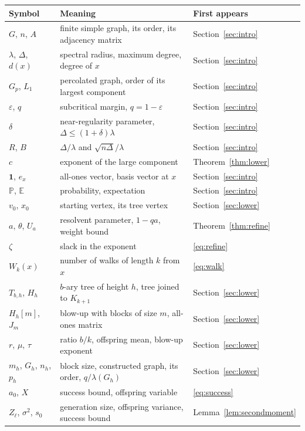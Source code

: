 \documentclass[11pt]{amsart}
\theoremstyle{remark}
\newcommand{\PP}{\mathbb{P}}
\newcommand{\EE}{\mathbb{E}}
\newcommand{\one}{\mathbf{1}}
\begin{document}
\begin{center}
\begin{tabular}{p{3.0cm}p{8.0cm}p{3.1cm}}
\toprule
Symbol & Meaning & First appears\\
\midrule
$G$, $n$, $A$ & finite simple graph, its order, its adjacency matrix & Section~\ref{sec:intro}\\
$\lambda$, $\Delta$, $d(x)$ & spectral radius, maximum degree, degree of $x$ & Section~\ref{sec:intro}\\
$G_p$, $L_1$ & percolated graph, order of its largest component & Section~\ref{sec:intro}\\
$\varepsilon$, $q$ & subcritical margin, $q=1-\varepsilon$ & Section~\ref{sec:intro}\\
$\delta$ & near-regularity parameter, $\Delta\le(1+\delta)\lambda$ & Section~\ref{sec:intro}\\
$R$, $B$ & $\Delta/\lambda$ and $\sqrt{n\Delta}/\lambda$ & Section~\ref{sec:intro}\\
$c$ & exponent of the large component & Theorem~\ref{thm:lower}\\
$\one$, $e_x$ & all-ones vector, basis vector at $x$ & Section~\ref{sec:intro}\\
$\PP$, $\EE$ & probability, expectation & Section~\ref{sec:intro}\\
$v_0$, $x_0$ & starting vertex, its tree vertex & Section~\ref{sec:lower}\\
$a$, $\theta$, $U_a$ & resolvent parameter, $1-qa$, weight bound & Theorem~\ref{thm:refine}\\
$\zeta$ & slack in the exponent & \eqref{eq:refine}\\
$W_k(x)$ & number of walks of length $k$ from $x$ & \eqref{eq:walk}\\
$T_{b,h}$, $H_h$ & $b$-ary tree of height $h$, tree joined to $K_{k+1}$ & Section~\ref{sec:lower}\\
$H_h[m]$, $J_m$ & blow-up with blocks of size $m$, all-ones matrix & Section~\ref{sec:lower}\\
$r$, $\mu$, $\tau$ & ratio $b/k$, offspring mean, blow-up exponent & Section~\ref{sec:lower}\\
$m_h$, $G_h$, $n_h$, $p_h$ & block size, constructed graph, its order, $q/\lambda(G_h)$ & Section~\ref{sec:lower}\\
$a_0$, $X$ & success bound, offspring variable & \eqref{eq:success}\\
$Z_\ell$, $\sigma^2$, $s_0$ & generation size, offspring variance, success bound & Lemma~\ref{lem:secondmoment}\\

\end{tabular}
\end{center}
\end{document}
